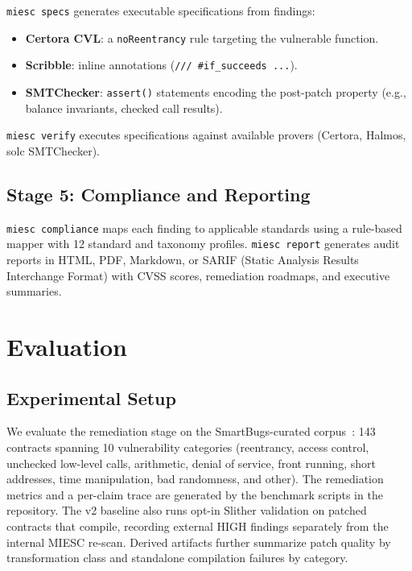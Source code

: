 \documentclass[conference]{IEEEtran}
\begin{document}
\texttt{miesc specs} generates executable specifications from findings:
\begin{itemize}
    \item \textbf{Certora CVL}: a \texttt{noReentrancy} rule targeting the vulnerable function.
    \item \textbf{Scribble}: inline annotations (\texttt{/// \#if\_succeeds ...}).
    \item \textbf{SMTChecker}: \texttt{assert()} statements encoding the post-patch property (e.g., balance invariants, checked call results).
\end{itemize}

\texttt{miesc verify} executes specifications against available provers (Certora, Halmos, solc SMTChecker).

\subsection{Stage 5: Compliance and Reporting}

\texttt{miesc compliance} maps each finding to applicable standards using a rule-based mapper with 12 standard and taxonomy profiles. \texttt{miesc report} generates audit reports in HTML, PDF, Markdown, or SARIF (Static Analysis Results Interchange Format) with CVSS scores, remediation roadmaps, and executive summaries.

\section{Evaluation}

\subsection{Experimental Setup}
\label{sec:setup}

We evaluate the remediation stage on the SmartBugs-curated corpus~\cite{ferreira2020smartbugs}: 143 contracts spanning 10 vulnerability categories (reentrancy, access control, unchecked low-level calls, arithmetic, denial of service, front running, short addresses, time manipulation, bad randomness, and other). The remediation metrics and a per-claim trace are generated by the benchmark scripts in the repository. The v2 baseline also runs opt-in Slither validation on patched contracts that compile, recording external HIGH findings separately from the internal MIESC re-scan. Derived artifacts further summarize patch quality by transformation class and standalone compilation failures by category.
\end{document}
